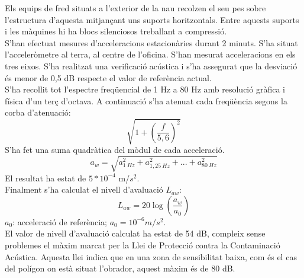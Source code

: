 \newline Els equips de fred situats a l'exterior de la nau recolzen el seu pes sobre l'estructura d'aquesta mitjançant uns suports horitzontals. Entre aquests suports i les màquines hi ha blocs silenciosos treballant a compressió.\\
%
%
%
%
%
%
%
\newline S'han efectuat mesures d'acceleracions estacionàries durant 2 minuts. S'ha situat l'acceleròmetre al terra, al centre de l'oficina. S'han mesurat acceleracions en els tres eixos. S'ha realitzat una verificació acústica i s'ha assegurat que la desviació és menor de 0,5 dB respecte el valor de referència actual.\\
\newline S'ha recollit tot l'espectre freqüencial de 1 Hz a 80 Hz amb resolució gràfica i física d'un terç d'octava. A continuació s'ha atenuat cada freqüència segons la corba d'atenuació:
\begin{equation}
\sqrt{1+\left ( \frac{f}{5,6} \right )^2}
\end{equation}
\noindent S'ha fet una suma quadràtica del mòdul de cada acceleració.
\begin{equation}
a_w = \sqrt{a_{1 \  Hz}^2 + a_{1,25 \  Hz}^2  + ... + a_{80 \  Hz}^2}
\end{equation}
\noindent El resultat ha estat de $ 5*10^{-4}$ m/$s^2$.\\
\newline Finalment s'ha calculat el nivell d'avaluació $L_{aw}$:
\begin{equation}
L_{aw} = 20 \log \left( \frac{a_w}{a_0} \right)
\end{equation}
\noindent $a_0$: acceleració de referència; $a_0 = 10^{-6} m/s^2$.\\
\newline El valor de nivell d'avaluació calculat ha estat de 54 dB, compleix sense problemes el màxim marcat per la Llei de Protecció contra la Contaminació Acústica. Aquesta llei indica que en una zona de sensibilitat baixa, com és el cas del polígon on està situat l'obrador, aquest màxim és de 80 dB. 




\clearpage